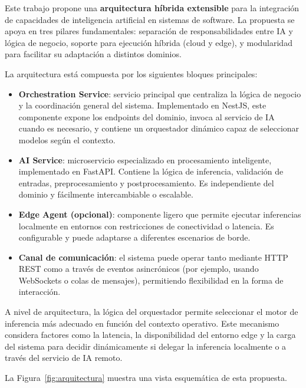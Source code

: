 \documentclass[a4paper]{llncs}
\begin{document}
Este trabajo propone una \textbf{arquitectura híbrida extensible} para la integración de capacidades de inteligencia artificial en sistemas de software. La propuesta se apoya en tres pilares fundamentales: separación de responsabilidades entre IA y lógica de negocio, soporte para ejecución híbrida (cloud y edge), y modularidad para facilitar su adaptación a distintos dominios. 

La arquitectura está compuesta por los siguientes bloques principales:

\begin{itemize}
    \item \textbf{Orchestration Service}: servicio principal que centraliza la lógica de negocio y la coordinación general del sistema. Implementado en NestJS, este componente expone los endpoints del dominio, invoca al servicio de IA cuando es necesario, y contiene un orquestador dinámico capaz de seleccionar modelos según el contexto.
    
    \item \textbf{AI Service}: microservicio especializado en procesamiento inteligente, implementado en FastAPI. Contiene la lógica de inferencia, validación de entradas, preprocesamiento y postprocesamiento. Es independiente del dominio y fácilmente intercambiable o escalable.
    
    \item \textbf{Edge Agent (opcional)}: componente ligero que permite ejecutar inferencias localmente en entornos con restricciones de conectividad o latencia. Es configurable y puede adaptarse a diferentes escenarios de borde.
    
    \item \textbf{Canal de comunicación}: el sistema puede operar tanto mediante HTTP REST como a través de eventos asincrónicos (por ejemplo, usando WebSockets o colas de mensajes), permitiendo flexibilidad en la forma de interacción.
\end{itemize}

A nivel de arquitectura, la lógica del orquestador permite seleccionar el motor de inferencia más adecuado en función del contexto operativo. Este mecanismo considera factores como la latencia, la disponibilidad del entorno edge y la carga del sistema para decidir dinámicamente si delegar la inferencia localmente o a través del servicio de IA remoto.

La Figura~\ref{fig:arquitectura} muestra una vista esquemática de esta propuesta.
\end{document}
